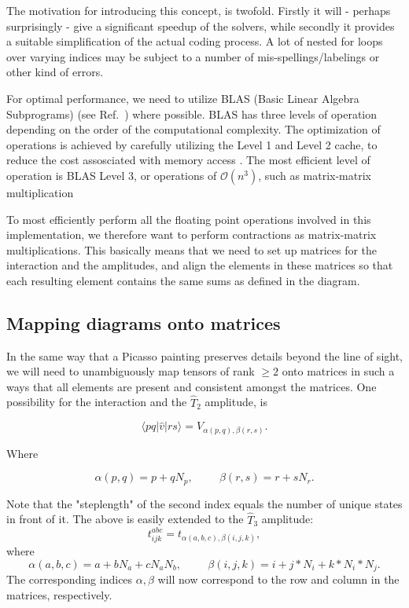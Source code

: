 The motivation for introducing this concept, is twofold. Firstly it
will - perhaps surprisingly - give a significant speedup of the
solvers, while secondly it provides a suitable simplification of the
actual coding process. A lot of nested for loops over varying indices
may be subject to a number of mis-spellings/labelings or other kind of
errors.

For optimal performance, we need to utilize BLAS (Basic Linear Algebra
Subprograms) (see Ref.~\cite{BLASsite}) where possible. BLAS has three
levels of operation depending on the order of the computational
complexity. The optimization of operations is achieved by carefully
utilizing the Level 1 and Level 2 cache, to reduce the cost
assosciated with memory access \cite{Karniadakis}. The most efficient
level of operation is BLAS Level 3, or operations of $\mathcal{O}
(n^3)$, such as matrix-matrix multiplication \cite{Karniadakis}

To most efficiently perform all the floating point operations involved
in this implementation, we therefore want to perform contractions as
matrix-matrix multiplications. This basically means that we need to
set up matrices for the interaction and the amplitudes, and align the
elements in these matrices so that each resulting element contains the
same sums as defined in the diagram.

\subsection{Mapping diagrams onto matrices}

In the same way that a Picasso painting preserves details beyond the
line of sight, we will need to unambiguously map tensors of rank $\geq
2$ onto matrices in such a ways that all elements are present and
consistent amongst the matrices. One possibility for the interaction
and the $\hat{T}_2$ amplitude, is

\begin{equation}
\langle p q \vert \hat{v}\vert r s \rangle = V_{\alpha(p,q), \beta(r,s)}.
\label{eqn:t2mapping}
\end{equation}

Where 

\begin{equation}
\alpha(p,q) = p + qN_p, \hspace{1cm}
\beta(r,s) = r + sN_r.
\label{eqn:t2mapping2}
\end{equation}

Note that the "steplength" of the second index equals the number of unique states in front of it. 
The above is easily extended to the $\hat{T}_3$ amplitude:
\begin{equation}
t^{abc}_{ijk} = t_{\alpha(a,b,c), \beta(i,j,k)},
\label{eqn:t3mapping}
\end{equation}
where 
\begin{equation}
\alpha(a,b,c) = a + bN_a + cN_aN_b,
\hspace{1cm}
\beta(i,j,k) = i + j*N_i + k*N_i*N_j.
\label{eqn:t3mapping2}
\end{equation}
The corresponding indices $\alpha,\beta$ will now correspond to the row and column in the matrices, respectively. 

